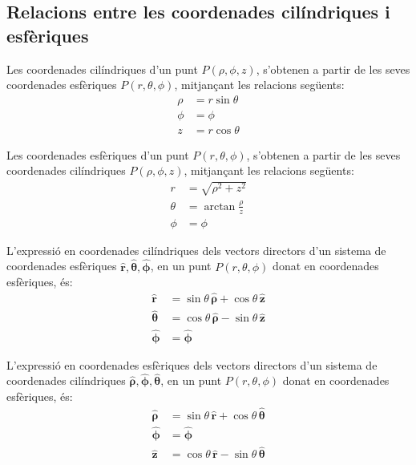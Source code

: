 \documentclass[catalan,a4paper,twoside,11pt]{article}
\begin{document}
\subsection{Relacions entre les coordenades cilíndriques i
esfèriques}

Les coordenades cilíndriques  d'un punt $P(\rho,\phi,z)$,
s'obtenen a partir de les seves coordenades esfèriques
$P(r,\theta,\phi)$, mitjançant les relacions següents:
\begin{subequations}\begin{align}
    \rho &=r\sin\theta \\ \phi &=\phi \\z &=r\cos\theta
\end{align}\end{subequations}

Les coordenades  esfèriques  d'un punt $P(r,\theta,\phi)$,
s'obtenen a partir de les seves coordenades cilíndriques
$P(\rho,\phi,z)$, mitjançant les relacions següents:
\begin{subequations}\begin{align}
    r &=\sqrt{\rho^2+z^2}\\
    \theta &=\arctan\frac{\rho}{z}\\
    \phi &=\phi
\end{align}\end{subequations}

L'expressió en coordenades cilíndriques dels vectors directors d'un sistema de coordenades  esfèriques $\boldsymbol{\hat{r}},\boldsymbol{\hat{\theta}},\boldsymbol{\hat{\phi}}$, en un punt $P(r,\theta,\phi)$ donat en coordenades esfèriques, és:
\begin{subequations}\begin{align}
    \boldsymbol{\hat{r}} &=\sin\theta\,\boldsymbol{\hat{\rho}}+\cos\theta\,\boldsymbol{\hat{z}}\\
    \boldsymbol{\hat{\theta}}
    &=\cos\theta\,\boldsymbol{\hat{\rho}}-\sin\theta\,\boldsymbol{\hat{z}}\\
    \boldsymbol{\hat{\phi}}&=\boldsymbol{\hat{\phi}}
\end{align}\end{subequations}

L'expressió en coordenades esfèriques dels vectors directors d'un sistema de coordenades  cilíndriques $\boldsymbol{\hat{\rho}},\boldsymbol{\hat{\phi}},\boldsymbol{\hat{\theta}}$, en un punt $P(r,\theta,\phi)$ donat en coordenades esfèriques, és:
\begin{subequations}\begin{align}
    \boldsymbol{\hat{\rho}} &=\sin\theta\,\boldsymbol{\hat{r}}+
    \cos\theta\,\boldsymbol{\hat{\theta}}\\
    \boldsymbol{\hat{\phi}}&=\boldsymbol{\hat{\phi}}\\
    \boldsymbol{\hat{z}} &=\cos\theta\,\boldsymbol{\hat{r}}-
    \sin\theta\,\boldsymbol{\hat{\theta}}
\end{align}\end{subequations}
\end{document}
